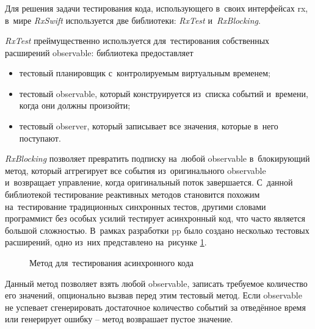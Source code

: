 \subsubsection{}
\label{sec:testing:tech:rx}

Для решения задачи тестирования кода, использующего в~своих интерфейсах \gls{rx}, в~мире \textit{RxSwift} используется две библиотеки: \textit{RxTest} и~\textit{RxBlocking}.

\textit{RxTest} преймущественно используется для~тестирования собственных расширений \gls{observable}: библиотека предоставляет

\begin{itemize}
	\item тестовый планировщик с~контролируемым виртуальным временем;
	\item тестовый \gls{observable}, который конструируется из~списка событий и~времени, когда они должны произойти;
	\item тестовый \gls{observer}, который записывает все значения, которые в~него поступают.
\end{itemize}

\textit{RxBlocking} позволяет превратить подписку на~любой \gls{observable} в~блокирующий метод, который аггрегирует все события из~оригинального \gls{observable} и~возвращает управление, когда оригинальный поток завершается. С~данной библиотекой тестирование реактивных методов становится похожим на~тестирование традиционных синхронных тестов, другими словами программист без особых усилий тестирует асинхронный код, что часто является большой сложностью. В~рамках разработки \gls{pp} было создано несколько тестовых расширений, одно из~них представлено на~рисунке \ref{sec:testing:tech:rx:testasync}.

\begin{figure}[h]
  
   \caption{Метод для~тестирования асинхронного кода}
   \label{sec:testing:tech:rx:testasync}
\end{figure}

Данный метод позволяет взять любой \gls{observable}, записать требуемое количество его значений, опционально вызвав перед этим тестовый метод. Если \gls{observable} не успевает сгенерировать достаточное количество событий за отведённое время или генерирует ошибку -- метод возврашает пустое значение.